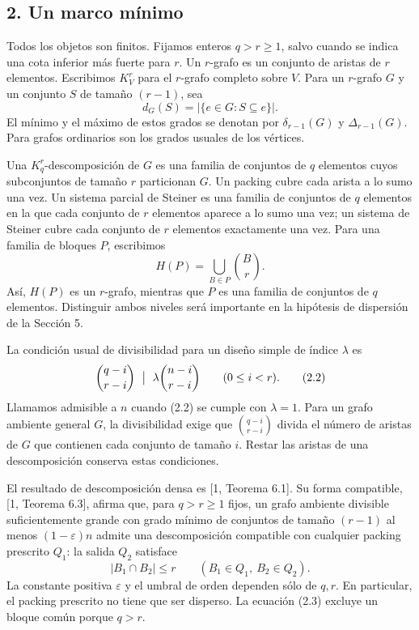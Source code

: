 \documentclass[spanish,11pt,a4paper]{article}
\begin{document}
\subsection{2. Un marco mínimo}\label{un-marco-muxednimo}

Todos los objetos son finitos. Fijamos enteros \(q>r\ge1\), salvo cuando se indica una cota inferior más fuerte para \(r\). Un \(r\)-grafo es un conjunto de aristas de \(r\) elementos. Escribimos \(K_V^r\) para el \(r\)-grafo completo sobre \(V\). Para un \(r\)-grafo \(G\) y un conjunto \(S\) de tamaño \((r-1)\), sea \[d_G(S)=|\{e\in G:S\subseteq e\}|.\] El mínimo y el máximo de estos grados se denotan por \(\delta_{r-1}(G)\) y \(\Delta_{r-1}(G)\). Para grafos ordinarios son los grados usuales de los vértices.

Una \(K_q^r\)-descomposición de \(G\) es una familia de conjuntos de \(q\) elementos cuyos subconjuntos de tamaño \(r\) particionan \(G\). Un packing cubre cada arista a lo sumo una vez. Un sistema parcial de Steiner es una familia de conjuntos de \(q\) elementos en la que cada conjunto de \(r\) elementos aparece a lo sumo una vez; un sistema de Steiner cubre cada conjunto de \(r\) elementos exactamente una vez. Para una familia de bloques \(P\), escribimos \[H(P)=\bigcup_{B\in P}\binom Br.
\tag{2.1}\] Así, \(H(P)\) es un \(r\)-grafo, mientras que \(P\) es una familia de conjuntos de \(q\) elementos. Distinguir ambos niveles será importante en la hipótesis de dispersión de la Sección 5.

La condición usual de divisibilidad para un diseño simple de índice \(\lambda\) es \[\binom{q-i}{r-i}\ \bigm|\ \lambda\binom{n-i}{r-i}
\qquad(0\le i<r).
\tag{2.2}\] Llamamos admisible a \(n\) cuando (2.2) se cumple con \(\lambda=1\). Para un grafo ambiente general \(G\), la divisibilidad exige que \(\binom{q-i}{r-i}\) divida el número de aristas de \(G\) que contienen cada conjunto de tamaño \(i\). Restar las aristas de una descomposición conserva estas condiciones.

El resultado de descomposición densa es {[}1, Teorema 6.1{]}. Su forma compatible, {[}1, Teorema 6.3{]}, afirma que, para \(q>r\ge1\) fijos, un grafo ambiente divisible suficientemente grande con grado mínimo de conjuntos de tamaño \((r-1)\) al menos \((1-\varepsilon)n\) admite una descomposición compatible con cualquier packing prescrito \(Q_1\): la salida \(Q_2\) satisface \[|B_1\cap B_2|\le r
\qquad(B_1\in Q_1,\ B_2\in Q_2).
\tag{2.3}\] La constante positiva \(\varepsilon\) y el umbral de orden dependen sólo de \(q,r\). En particular, el packing prescrito no tiene que ser disperso. La ecuación (2.3) excluye un bloque común porque \(q>r\).
\end{document}
